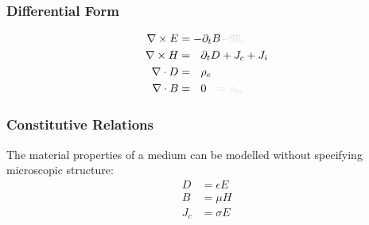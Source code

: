 \documentclass{article}
\numberwithin{equation}{section}
\begin{document}
        \subsubsection{Differential Form}
            \begin{subequations}\label{eq:Maxwell}
                \begin{align}
                    \nabla \times E &= - \partial_t B \begingroup \textcolor{vanish}{
                        - \mathfrak{M}_i } \endgroup \label{eq:MaxwellFaraday} \\
                    \nabla \times H &= \ \ \partial_t D + J_{c} + J_{i} 
                        \label{eq:AmpereMaxwell} \\
                    \nabla \cdot D &= \ \ \rho_e \label{eq:GaussElectric} \\
                    \nabla \cdot B &= \ \ 0 \begingroup \textcolor{vanish}{
                        \quad = \rho_m} \endgroup \label{eq:GaussMagnetic}
                \end{align}
            \end{subequations}
        \subsubsection{Constitutive Relations} 
            The material properties of a medium can be modelled without specifying 
            microscopic structure:
            \begin{subequations}\label{eq:Constitutive}
                \begin{align}
                    D &= \epsilon E \label{eq:ConstitutiveElectric} \\ 
                    B &= \mu H \label{eq:ConstitutiveMagnetic} \\
                    J_c &= \sigma E \label{eq:ConstitutiveCurrentDensity}
                \end{align}
            \end{subequations}
\end{document}
